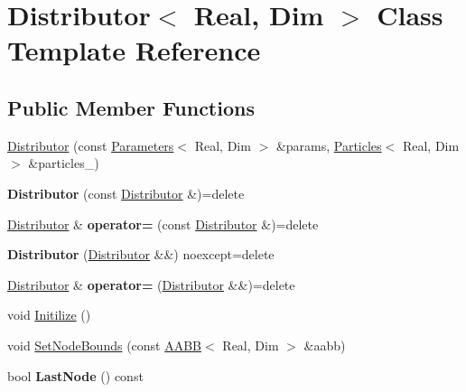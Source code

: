 \hypertarget{classDistributor}{}\section{Distributor$<$ Real, Dim $>$ Class Template Reference}
\label{classDistributor}
\subsection*{Public Member Functions}
\begin{DoxyCompactItemize}
\item 
\hyperlink{classDistributor_a28b0eb640ee22135e0566d2fc29abfb4}{Distributor} (const \hyperlink{classParameters}{Parameters}$<$ Real, Dim $>$ \&params, \hyperlink{classParticles}{Particles}$<$ Real, Dim $>$ \&particles\+\_\+)
\item 
\hypertarget{classDistributor_a73ef5ca71d4cff8fffd87f3b42922fad}{}{\bfseries Distributor} (const \hyperlink{classDistributor}{Distributor} \&)=delete\label{classDistributor_a73ef5ca71d4cff8fffd87f3b42922fad}

\item 
\hypertarget{classDistributor_abcc51f27dfc345acf264642c338fa7e3}{}\hyperlink{classDistributor}{Distributor} \& {\bfseries operator=} (const \hyperlink{classDistributor}{Distributor} \&)=delete\label{classDistributor_abcc51f27dfc345acf264642c338fa7e3}

\item 
\hypertarget{classDistributor_a7c5ecf5f7f912c758317b8cfd85f7f76}{}{\bfseries Distributor} (\hyperlink{classDistributor}{Distributor} \&\&) noexcept=delete\label{classDistributor_a7c5ecf5f7f912c758317b8cfd85f7f76}

\item 
\hypertarget{classDistributor_a6b02405b5ed14d90a4baf3441521cab0}{}\hyperlink{classDistributor}{Distributor} \& {\bfseries operator=} (\hyperlink{classDistributor}{Distributor} \&\&)=delete\label{classDistributor_a6b02405b5ed14d90a4baf3441521cab0}

\item 
void \hyperlink{classDistributor_a1468124b3b60be412af5d0c1c4b9384f}{Initilize} ()
\item 
void \hyperlink{classDistributor_a0a57fa982d214c7f02f40875bde3d866}{Set\+Node\+Bounds} (const \hyperlink{classAABB}{A\+A\+B\+B}$<$ Real, Dim $>$ \&aabb)
\item 
\hypertarget{classDistributor_a0b4db4298e86c87f62f2301905666af8}{}bool {\bfseries Last\+Node} () const \label{classDistributor_a0b4db4298e86c87f62f2301905666af8}


\end{DoxyCompactItemize}
